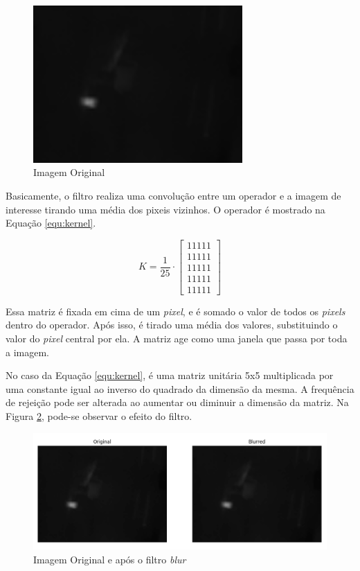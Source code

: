 		\begin{figure}[!ht]
		   \centering
		   \includegraphics[width=8cm]{Figures/flirphoto.png}
		   \caption{Imagem Original}
		   \label{fig:img_80graus}
		\end{figure}
		
		Basicamente, o filtro realiza uma convolução entre um operador e a imagem de interesse tirando uma média dos pixeis vizinhos. O operador é mostrado na Equação \ref{equ:kernel}.
		
		\begin{equation}
			K = \frac{1}{25}\cdot \begin{bmatrix}
			 1  1  1  1  1\\ 
			 1  1  1  1  1\\ 
			 1  1  1  1  1\\ 
			 1  1  1  1  1\\ 
			 1  1  1  1  1 
			\end{bmatrix}
			\label{equ:kernel}
		\end{equation}
		
		Essa matriz é fixada em cima de um \textit{pixel}, e é somado o valor de todos os \textit{pixels} dentro do operador. Após isso, é tirado uma média dos valores, substituindo o valor do \textit{pixel} central por ela. A matriz age como uma janela que passa por toda a imagem.
		
		 No caso da Equação \ref{equ:kernel}, é uma matriz unitária 5x5 multiplicada por uma constante igual ao inverso do quadrado da dimensão da mesma. A frequência de rejeição pode ser alterada ao aumentar ou diminuir a dimensão da matriz. Na Figura \ref{fig:blur}, pode-se observar o efeito do filtro.
		
		\begin{figure}[!ht]
		   \centering
		   \includegraphics[width=16cm]{Figures/blur.png}
		   \caption{Imagem Original e após o filtro \textit{blur}}
		   \label{fig:blur}
		\end{figure}
		

